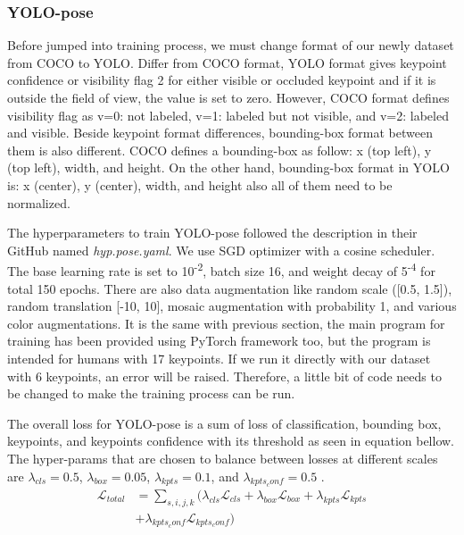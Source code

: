 \subsubsection{YOLO-pose}
\label{subsubsec:training-yolo-pose}

Before jumped into training process, we must change format of our newly dataset from COCO to YOLO. Differ from COCO format, YOLO format gives keypoint confidence or visibility flag 2 for either visible or occluded keypoint
and if it is outside the field of view, the value is set to zero. However, COCO format defines visibility flag as v=0: not labeled, v=1: labeled but not visible, and v=2: labeled and visible. 
Beside keypoint format differences, bounding-box format between them is also different. COCO defines a bounding-box as follow: x (top left), y (top left), width, and height. On the other hand,
bounding-box format in YOLO is: x (center), y (center), width, and height also all of them need to be normalized.

The hyperparameters to train YOLO-pose followed the description in their GitHub named \emph{hyp.pose.yaml}.
We use SGD optimizer with a cosine scheduler. The base learning rate is set to 10\textsuperscript{-2}, batch size 16,
and weight decay of 5\textsuperscript{-4} for total 150 epochs. There are also data augmentation like random scale ([0.5, 1.5]),
random translation [-10, 10], mosaic augmentation with probability 1, and various color augmentations.
It is the same with previous section, the main program for training has been provided using PyTorch framework too, but the program is intended for humans with 17 keypoints.
If we run it directly with our dataset with 6 keypoints, an error will be raised. Therefore, a little bit of code needs to be changed to make the training process can be run.

The overall loss for YOLO-pose is a sum of loss of classification, bounding box, keypoints, and keypoints confidence with its threshold as seen in equation bellow.
The hyper-params that are chosen to balance between losses at different scales are $\lambda_{cls} = 0.5$, $\lambda_{box} = 0.05$, $\lambda_{kpts} = 0.1$, and $\lambda_{kpts_conf} = 0.5$ \citep{maji2022yolopose}.
\begin{equation} \label{eq:overall-loss-yolo}
  \begin{split}
    \mathcal{L}_{total} & = \sum_{s,i,j,k} (\lambda_{cls}\mathcal{L}_{cls} + \lambda_{box}\mathcal{L}_{box} + \lambda_{kpts}\mathcal{L}_{kpts} \\
    & + \lambda_{kpts_conf}\mathcal{L}_{kpts_conf})
  \end{split}
\end{equation}

